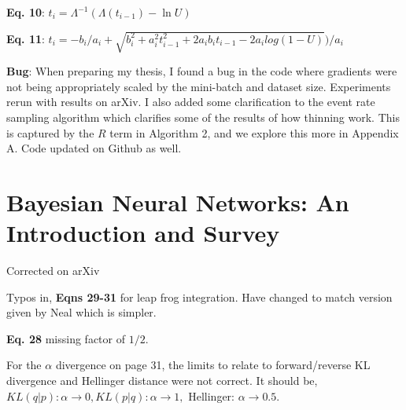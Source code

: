 \documentclass{article}
\begin{document}
\textbf{Eq. 10}: $t_{i} = \Lambda^{-1}(\Lambda(t_{i-1}) - \ln U)$

\textbf{Eq. 11}: $t_{i} =  -b_{i} / a_{i} + \sqrt{b_{i}^{2} +  a_{i}^{2}t_{i-1}^{2} + 2a_{i}b_{i}t_{i-1} - 2a_{i}log(1 - U)}\big ) /a_{i}$

\textbf{Bug}: When preparing my thesis, I found a bug in the code where gradients were not being appropriately scaled by the mini-batch and dataset size. Experiments rerun with results on arXiv. I also added some clarification to the event rate sampling algorithm which clarifies some of the results of how thinning work. This is captured by the $R$ term in Algorithm 2, and we explore this more in Appendix A. Code updated on Github as well.

\vspace*{1cm}
\section{Bayesian Neural Networks: An Introduction and Survey}
Corrected on arXiv

Typos in, \textbf{Eqns 29-31} for leap frog integration. Have changed to match version given by Neal which is simpler.

\textbf{Eq. 28} missing factor of $1/2$.

For the $\alpha$ divergence on page 31, the limits to relate to forward/reverse KL divergence and Hellinger distance were not correct. It should be, $KL(q|p): \alpha \rightarrow 0, KL(p|q): \alpha \rightarrow 1,$ Hellinger: $ \alpha \rightarrow 0.5$.
\end{document}
